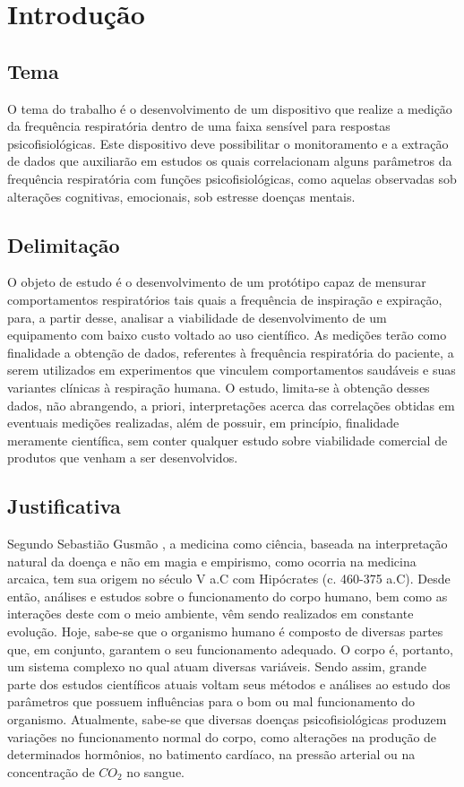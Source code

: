   \chapter{Introdução}
  
  \section{Tema}
  
  O tema do trabalho é o desenvolvimento de um dispositivo que realize a medição da frequência respiratória dentro de uma faixa sensível para respostas psicofisiológicas. Este dispositivo deve possibilitar o monitoramento e a extração de dados que auxiliarão em estudos os quais correlacionam alguns parâmetros da frequência respiratória com funções psicofisiológicas, como aquelas observadas sob alterações cognitivas, emocionais, sob estresse  doenças mentais.
  
  \section{Delimitação}
  
  O objeto de estudo é o desenvolvimento de um protótipo capaz de mensurar comportamentos respiratórios tais quais a frequência de inspiração e expiração, para, a partir desse, analisar a viabilidade de desenvolvimento de um equipamento com baixo custo voltado ao uso científico. As medições terão como finalidade a obtenção de dados, referentes à frequência respiratória do paciente, a serem utilizados em experimentos que vinculem comportamentos saudáveis e suas variantes clínicas à respiração humana. O estudo, limita-se à obtenção desses dados, não abrangendo, a priori, interpretações acerca das correlações obtidas em eventuais medições realizadas, além de possuir, em princípio, finalidade meramente científica, sem conter qualquer estudo sobre viabilidade comercial de produtos que venham a ser desenvolvidos.
  
  \section{Justificativa}
 
   Segundo Sebastião Gusmão \cite{gusmao2004historia}, a medicina como ciência, baseada na interpretação natural da doença e não em magia e empirismo, como ocorria na medicina arcaica, tem sua origem no século V a.C com Hipócrates (c. 460-375 a.C). Desde então, análises e estudos sobre o funcionamento do corpo humano, bem como as interações deste com o meio ambiente, vêm sendo realizados em constante evolução. Hoje, sabe-se que o organismo humano é composto de diversas partes que, em conjunto, garantem o seu funcionamento adequado. O corpo é, portanto, um sistema complexo no qual atuam diversas variáveis. Sendo assim, grande parte dos estudos científicos atuais voltam seus métodos e análises ao estudo dos parâmetros que possuem influências para o bom ou mal funcionamento do organismo. Atualmente, sabe-se que diversas doenças psicofisiológicas produzem variações no funcionamento normal do corpo, como alterações na produção de determinados hormônios, no batimento cardíaco, na pressão arterial ou na concentração de $CO_2$ no sangue. 
   
